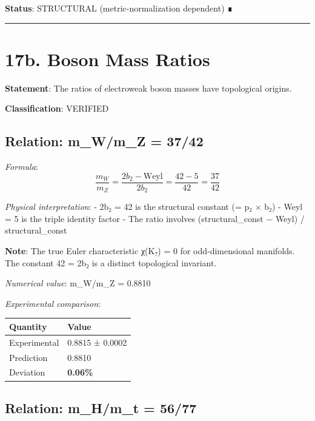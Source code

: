 \documentclass[11pt,a4paper]{article}
\begin{document}
\textbf{Status}: STRUCTURAL (metric-normalization dependent) ∎

\begin{center}\rule{\linewidth}{0.5pt}\end{center}

\section{17b. Boson Mass Ratios}\label{b.-boson-mass-ratios}

\textbf{Statement}: The ratios of electroweak boson masses have topological origins.

\textbf{Classification}: VERIFIED

\subsection{Relation: m\_\allowbreak{}W/m\_\allowbreak{}Z = 37/42}\label{relation-m_wm_z-3742}

\emph{Formula}: \[\frac{m_W}{m_Z} = \frac{2b_2 - \text{Weyl}}{2b_2} = \frac{42 - 5}{42} = \frac{37}{42}\]

\emph{Physical interpretation}: - 2b₂ = 42 is the structural constant (= p₂ × b₂) - Weyl = 5 is the triple identity factor - The ratio involves (structural\_\allowbreak{}const − Weyl) / structural\_\allowbreak{}const

\textbf{Note}: The true Euler characteristic χ(K₇) = 0 for odd-dimensional manifolds. The constant 42 = 2b₂ is a distinct topological invariant.

\emph{Numerical value}: m\_\allowbreak{}W/m\_\allowbreak{}Z = 0.8810

\emph{Experimental comparison}:

\begin{longtable}[]{@{}ll@{}}
\toprule\noalign{}
Quantity & Value \\
\midrule\noalign{}
\endhead
\bottomrule\noalign{}
\endlastfoot
Experimental & 0.8815 ± 0.0002 \\
Prediction & 0.8810 \\
Deviation & \textbf{0.06\%} \\
\end{longtable}

\subsection{Relation: m\_\allowbreak{}H/m\_\allowbreak{}t = 56/77}\label{relation-m_hm_t-5677}
\end{document}
